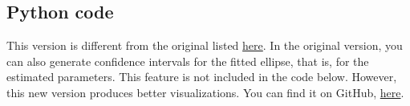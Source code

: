 \documentclass[oneside,10pt]{book}
\begin{document}


\subsection{Python code}\label{pcrf}

This version is different from the original listed \href{https://github.com/VincentGranville/Machine-Learning/blob/main/Source\%20Code/fittingEllipse.py}{here}. In the original version, you can also generate confidence intervals for the fitted ellipse, that is, for the estimated parameters.
This feature is not included in the code below. However, this new version produces better visualizations.  You can find it on GitHub, \href{https://github.com/VincentGranville/Machine-Learning/blob/main/Source\%20Code/fittingEllipse_v2.py}{here}.
\vspace{1ex}
\end{document}
